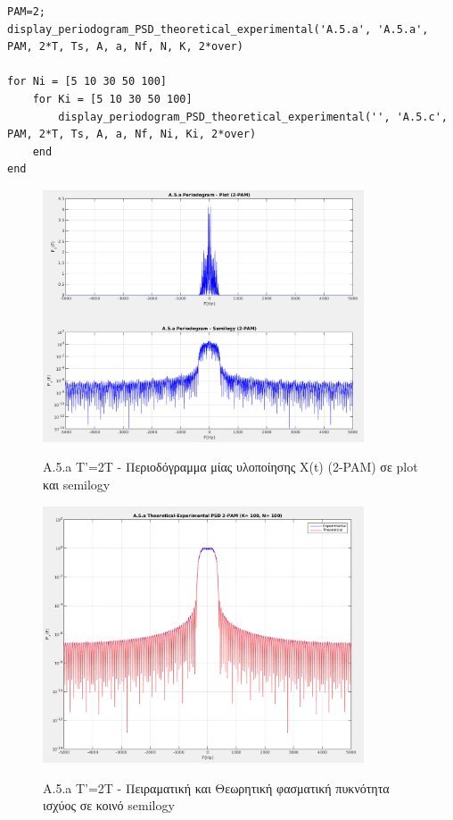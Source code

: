 \documentclass[11pt]{article}
\begin{document}
    \begin{lstlisting}[caption = {A.5 Επανάληψη του Α.3 για διαφορετικό T}]
PAM=2;
display_periodogram_PSD_theoretical_experimental('A.5.a', 'A.5.a', PAM, 2*T, Ts, A, a, Nf, N, K, 2*over)

for Ni = [5 10 30 50 100] 
    for Ki = [5 10 30 50 100]
        display_periodogram_PSD_theoretical_experimental('', 'A.5.c', PAM, 2*T, Ts, A, a, Nf, Ni, Ki, 2*over)
    end
end
    \end{lstlisting}
    
      \begin{figure}[H]
        \centering
        \includegraphics[scale=0.5, width=0.85\textwidth]{figures/A5.1-Periodogram.png} \\
        \caption{A.5.a T'=2T - Περιοδόγραμμα μίας υλοποίησης X(t) (2-PAM) σε plot και semilogy}
    \end{figure}
    
      \begin{figure}[H]
        \centering
        \includegraphics[scale=0.5, width=0.85\textwidth]{figures/A5.1-T_E_PSD.png} \\
        \caption{A.5.a T'=2T - Πειραματική και Θεωρητική φασματική πυκνότητα ισχύος σε κοινό semilogy}
    \end{figure}
    
\end{document}

